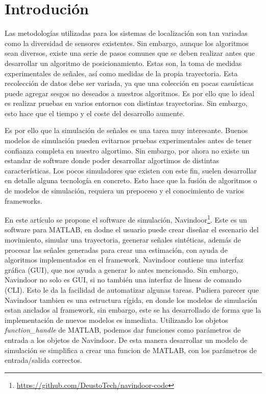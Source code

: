 \section{Introdución}


Las metodologías utilizadas para los sistemas de localización son tan variadas como la diversidad de sensores existentes. Sin embargo, aunque los algoritmos sean diversos, existe una serie de pasos comunes que se deben realizar antes que desarrollar un algoritmo de posicionamiento. Estas son, la toma de medidas experimentales de señales, así como medidas de la propia trayectoria. Esta recolección de datos debe ser variada, ya que una colección en pocas casuísticas puede agregar sesgos no deseados a nuestros algoritmos. Es por ello que lo ideal es realizar pruebas en varios entornos con distintas trayectorias. Sin embargo, esto hace que el tiempo y el coste del desarrollo aumente. 


Es por ello que la simulación de señales es una tarea muy interesante. Buenos modelos de simulación pueden evitarnos pruebas experimentales antes de tener confianza completa en nuestro algortimo. Sin embargo, por ahora no existe un estandar de software donde poder desarrollar algortimos de distintas características. Los pocos simuladores que existen con este fin, suelen desarrollar en detalle alguna tecnología en concreto. Esto hace que la fusión de algoritmos o de modelos de simulación, requiera un prepoceso y el conocimiento de varios frameworks.


En este artículo se propone el software de simulación, Navindoor\footnote{\url{https://github.com/DeustoTech/navindoor-code}}. Este es un software para MATLAB, en dodne el usuario puede crear diseñar el escenario del movimiento, simular una trayectoria, geenerar señales sintéticas, además de procesar las señales generadas para crear una estimación, con ayuda de algoritmos implementados en el framework. Navindoor contiene una interfaz gráfica (GUI), que nos ayuda a generar lo antes mencionado. Sin embargo, Navindoor no solo es GUI, si no también una interfaz de lineas de comando (CLI). Esto le da la facilidad de automatizar algunas tareas. Pudiera parecer que Navindoor tambien es una estructura rígida, en donde los modelos de simulación estan anclados al framework, sin embargo, este se ha desarrollado de forma que la implementación de nuevos modelos es inmediata. Utilizando los objetos \emph{function\_handle} de MATLAB, podemos dar funciones como parámetros de entrada a los objetos de Navindoor. De esta manera desarrollar un modelo de simulación se simplifica a crear una funcion de MATLAB, con los parámetros de entrada/salida correctos.

